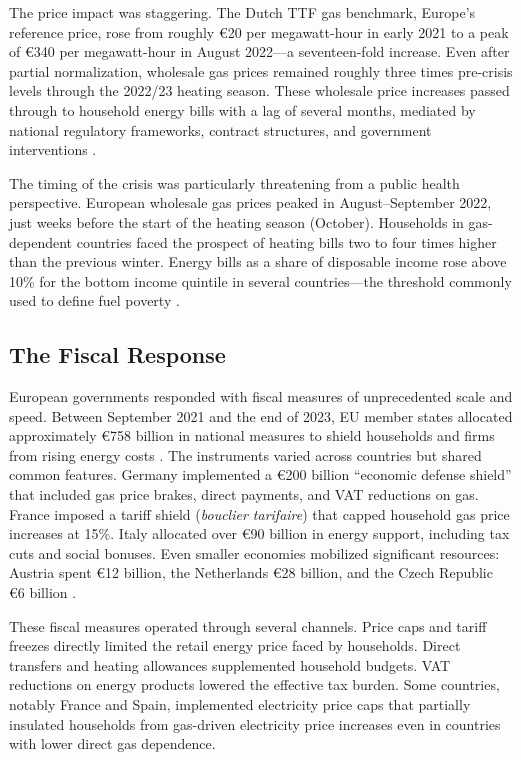 \documentclass[12pt]{article}
\begin{document}
The price impact was staggering. The Dutch TTF gas benchmark, Europe's reference price, rose from roughly \euro 20 per megawatt-hour in early 2021 to a peak of \euro 340 per megawatt-hour in August 2022---a seventeen-fold increase. Even after partial normalization, wholesale gas prices remained roughly three times pre-crisis levels through the 2022/23 heating season. These wholesale price increases passed through to household energy bills with a lag of several months, mediated by national regulatory frameworks, contract structures, and government interventions \citep{eurocomm2023}.

The timing of the crisis was particularly threatening from a public health perspective. European wholesale gas prices peaked in August--September 2022, just weeks before the start of the heating season (October). Households in gas-dependent countries faced the prospect of heating bills two to four times higher than the previous winter. Energy bills as a share of disposable income rose above 10\% for the bottom income quintile in several countries---the threshold commonly used to define fuel poverty \citep{hills2019}.

\subsection{The Fiscal Response}

European governments responded with fiscal measures of unprecedented scale and speed. Between September 2021 and the end of 2023, EU member states allocated approximately \euro 758 billion in national measures to shield households and firms from rising energy costs \citep{bruegel2023}. The instruments varied across countries but shared common features. Germany implemented a \euro 200 billion ``economic defense shield'' that included gas price brakes, direct payments, and VAT reductions on gas. France imposed a tariff shield (\emph{bouclier tarifaire}) that capped household gas price increases at 15\%. Italy allocated over \euro 90 billion in energy support, including tax cuts and social bonuses. Even smaller economies mobilized significant resources: Austria spent \euro 12 billion, the Netherlands \euro 28 billion, and the Czech Republic \euro 6 billion \citep{mcwilliams2024}.

These fiscal measures operated through several channels. Price caps and tariff freezes directly limited the retail energy price faced by households. Direct transfers and heating allowances supplemented household budgets. VAT reductions on energy products lowered the effective tax burden. Some countries, notably France and Spain, implemented electricity price caps that partially insulated households from gas-driven electricity price increases even in countries with lower direct gas dependence.
\end{document}
